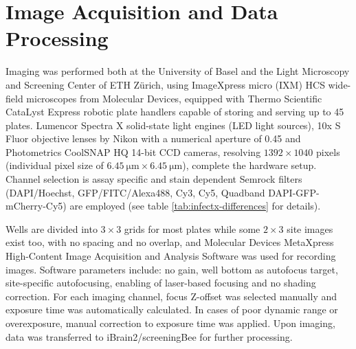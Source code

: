 \section{Image Acquisition and Data Processing}
Imaging was performed both at the University of Basel and the Light Microscopy and Screening Center of ETH Z\"urich, using ImageXpress micro (IXM) HCS wide-field microscopes from Molecular Devices, equipped with Thermo Scientific CataLyst Express robotic plate handlers capable of storing and serving up to 45 plates. Lumencor Spectra X solid-state light engines (LED light sources), 10x S Fluor objective lenses by Nikon with a numerical aperture of 0.45 and Photometrics CoolSNAP HQ 14-bit CCD cameras, resolving $1392 \times 1040$ pixels (individual pixel size of $\SI{6.45}{\micro\meter} \times \SI{6.45}{\micro\meter}$), complete the hardware setup. Channel selection is assay specific and stain dependent Semrock filters (DAPI\slash Hoechst, GFP\slash FITC\slash Alexa488, Cy3, Cy5, Quadband DAPI-GFP-mCherry-Cy5) are employed (see table \ref{tab:infectx-differences} for details).

Wells are divided into $3 \times 3$ grids for most plates while some $2 \times 3$ site images exist too, with no spacing and no overlap, and Molecular Devices MetaXpress High-Content Image Acquisition and Analysis Software was used for recording images. Software parameters include: no gain, well bottom as autofocus target, site-specific autofocusing, enabling of laser-based focusing and no shading correction. For each imaging channel, focus Z-offset was selected manually and exposure time was automatically calculated. In cases of poor dynamic range or overexposure, manual correction to exposure time was applied. Upon imaging, data was transferred to iBrain2\slash screeningBee \citep{Rouilly2012} for further processing.

